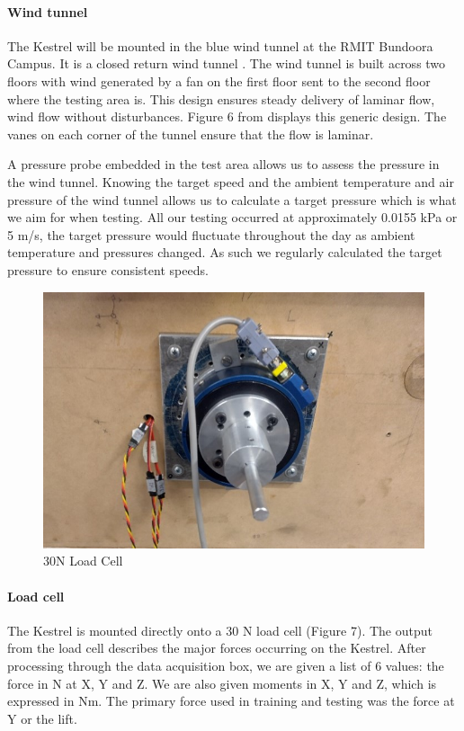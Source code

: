     \paragraph{Wind tunnel}
    The Kestrel will be mounted in the blue wind tunnel at the RMIT
    Bundoora Campus. It is a closed return wind tunnel \cite{11}. The
    wind tunnel is built across two floors with wind generated by a fan on
    the first floor sent to the second floor where the testing area is.
    This design ensures steady delivery of laminar flow, wind flow without
    disturbances. Figure 6 from displays this generic design. The vanes on
    each corner of the tunnel ensure that the flow is laminar. 

    A pressure probe embedded in the test area allows us to assess the
    pressure in the wind tunnel. Knowing the target speed and the ambient
    temperature and air pressure of the wind tunnel allows us to calculate
    a target pressure which is what we aim for when testing. All our testing
    occurred at approximately 0.0155 kPa or 5 m/s, the target pressure would
    fluctuate throughout the day as ambient temperature and pressures
    changed. As such we regularly calculated the target pressure to ensure
    consistent speeds.

    \begin{figure}
        \includegraphics[width=\textwidth/2]{./img/Fig3_load_cell.jpg}
        \caption{\label{fig:figure 3} 30N Load Cell}
    \end{figure}

   \paragraph{Load cell} The Kestrel is mounted directly onto a 30 N load cell (Figure 7). The
   output from the load cell describes the major forces occurring on the
   Kestrel. After processing through the data acquisition box, we are given
   a list of 6 values: the force in N at X, Y and Z. We are also given
   moments in X, Y and Z, which is expressed in Nm. The primary force used
    in training and testing was the force at Y or the lift.

